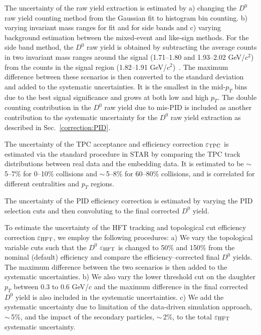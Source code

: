 \documentclass[%
 reprint,	
showpacs,
 amsmath,amssymb,
 aps,
 prc,
]{revtex4-1}
\providecommand{\DIFaddtex}[1]{{\protect\color{blue}\uwave{#1}}} %
\providecommand{\DIFdeltex}[1]{{\protect\color{red}\sout{#1}}}                      %
\providecommand{\DIFaddbegin}{} %
\providecommand{\DIFaddend}{} %
\providecommand{\DIFdelbegin}{} %
\providecommand{\DIFdelend}{} %
\providecommand{\DIFadd}[1]{\texorpdfstring{\DIFaddtex{#1}}{#1}} %
\providecommand{\DIFdel}[1]{\texorpdfstring{\DIFdeltex{#1}}{}} %
\begin{document}
The uncertainty of the raw yield extraction is estimated by a) changing the $D^0$ raw yield counting method from the Gaussian fit to histogram bin counting. b) varying invariant mass ranges for fit and for side bands and c) varying background estimation between the mixed-event and like-sign methods. For the side band method, the $D^0$ raw yield is obtained by subtracting the average counts in two invariant mass ranges around the signal (1.71--1.80 and 1.93--2.02 GeV/$c^2$) from the counts in the signal region (1.82--1.91 GeV/$c^2$)~\cite{Star_D_v2,Star_D_pp}. The maximum difference between these scenarios is then converted to the standard deviation and added to the systematic uncertainties. It is the smallest in the mid-$p_{T}$ bins due to the best signal significance and grows at both low and high $p_{T}$. The double counting contribution in the $D^0$ raw yield  due to mis-PID is included as another contribution to the systematic uncertainty for the $D^0$ raw yield extraction as described in Sec.~\ref{correction:PID}.

The uncertainty of the TPC acceptance and efficiency correction $\varepsilon_{\rm TPC}$ is estimated via the standard procedure in STAR by comparing the TPC track distributions between real data and the embedding data. It is estimated to be \DIFdelbegin \DIFdel{$\sim$}\DIFdelend \DIFaddbegin \DIFadd{$\approx$}\DIFaddend \,5--7\% for 0--10\% collisions and \DIFdelbegin \DIFdel{$\sim$}\DIFdelend \DIFaddbegin \DIFadd{$\approx$}\DIFaddend \,5--8\% for 60--80\% collisions, and is correlated for different centralities and $p_{T}$ regions. 

The uncertainty of the PID efficiency correction is estimated by varying the PID selection cuts and then convoluting to the final corrected $D^0$ yield. 


To estimate the uncertainty of the HFT tracking and topological cut efficiency correction $\varepsilon_{\rm HFT}$, we employ the following procedures: a) We vary the topological variable cuts such that the $D^0$ $\varepsilon_{\rm HFT}$ is changed to 50\% and 150\% from the nominal (default) efficiency and compare the efficiency--corrected final $D^0$ yields. The maximum difference between the two scenarios is then added to the systematic uncertainties. b) We also vary the lower threshold cut on the daughter $p_{T}$ between 0.3 to 0.6 GeV/$c$ and the maximum difference in the final corrected $D^0$ yield is also included in the systematic uncertainties. c) We add the systematic uncertainty due to limitation of the data-driven simulation approach, \DIFdelbegin \DIFdel{$\sim$}\DIFdelend \DIFaddbegin \DIFadd{$\approx$}\DIFaddend \,5\%, and the impact of the secondary particles, \DIFdelbegin \DIFdel{$\sim$}\DIFdelend \DIFaddbegin \DIFadd{$\approx$}\DIFaddend \,2\%, to the total $\varepsilon_{\rm HFT}$ systematic uncertainty.
\end{document}
